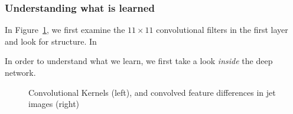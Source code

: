 \documentclass{article}
\begin{document}
\subsubsection{Understanding what is learned} %
\label{ssub:understanding_what_is_learned}

In Figure~\ref{fig:convkernels}, we first examine the $11\times11$ convolutional filters in the first layer and look for structure. In

In order to understand what we learn, we first take a look \emph{inside} the deep network. 
\begin{figure}[bt]
  \begin{center}
      \caption{Convolutional Kernels (left), and convolved feature differences in jet images (right)}
      \label{fig:convkernels}

    \end{center}
\end{figure}
\end{document}

